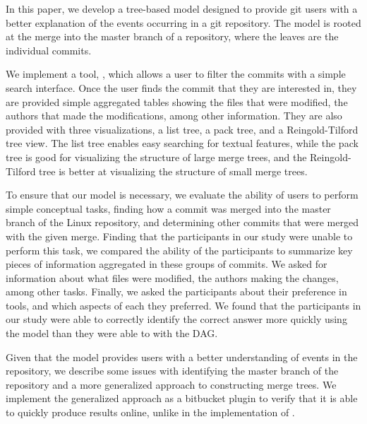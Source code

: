 In this paper, we develop a tree-based model designed to provide git
users with a better explanation of the events occurring in a git
repository. The \mt model is rooted at the merge into the master branch
of a repository, where the leaves are the individual commits.

We implement a tool, \tool, which allows a user to filter the commits
with a simple search interface. Once the user finds the commit that they
are interested in, they are provided simple aggregated tables showing
the files that were modified, the authors that made the modifications,
among other information. They are also provided with three
visualizations, a list tree, a pack tree, and a Reingold-Tilford tree
view. The list tree enables easy searching for textual features, while
the pack tree is good for visualizing the structure of large merge
trees, and the Reingold-Tilford tree is better at visualizing the
structure of small merge trees.

To ensure that our model is necessary, we evaluate the ability of users
to perform simple conceptual tasks, finding how a commit was merged into
the master branch of the Linux repository, and determining other commits
that were merged with the given merge. Finding that the participants in
our study were unable to perform this task, we compared the ability of
the participants to summarize key pieces of information aggregated in
these groups of commits. We asked for information about what files were
modified, the authors making the changes, among other tasks. Finally, we
asked the participants about their preference in tools, and which
aspects of each they preferred. We found that the participants in our
study were able to correctly identify the correct answer more quickly
using the \mt model than they were able to with the DAG.

Given that the model provides users with a better understanding of
events in the repository, we describe some issues with identifying the
master branch of the repository and a more generalized approach to
constructing merge trees. We implement the generalized approach as a
bitbucket plugin to verify that it is able to quickly produce results
online, unlike in the implementation of \tool.




